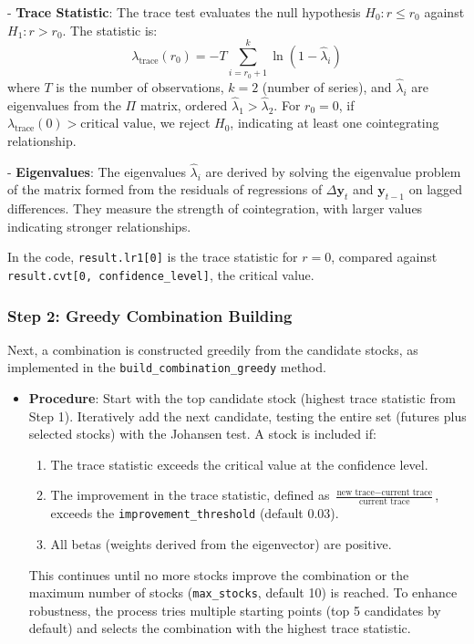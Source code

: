 \documentclass[a4paper,12pt]{article}
\begin{document}
- \textbf{Trace Statistic}: The trace test evaluates the null hypothesis \(H_0: r \leq r_0\) against \(H_1: r > r_0\). The statistic is:
  \[
  \lambda_{\text{trace}}(r_0) = -T \sum_{i=r_0+1}^{k} \ln(1 - \hat{\lambda}_i)
  \]
  where \(T\) is the number of observations, \(k = 2\) (number of series), and \(\hat{\lambda}_i\) are eigenvalues from the \(\Pi\) matrix, ordered \(\hat{\lambda}_1 > \hat{\lambda}_2\). For \(r_0 = 0\), if \(\lambda_{\text{trace}}(0) > \text{critical value}\), we reject \(H_0\), indicating at least one cointegrating relationship.

- \textbf{Eigenvalues}: The eigenvalues \(\hat{\lambda}_i\) are derived by solving the eigenvalue problem of the matrix formed from the residuals of regressions of \(\Delta \mathbf{y}_t\) and \(\mathbf{y}_{t-1}\) on lagged differences. They measure the strength of cointegration, with larger values indicating stronger relationships.

In the code, \texttt{result.lr1[0]} is the trace statistic for \(r = 0\), compared against \texttt{result.cvt[0, confidence\_level]}, the critical value.

\subsubsection{Step 2: Greedy Combination Building}
Next, a combination is constructed greedily from the candidate stocks, as implemented in the \texttt{build\_combination\_greedy} method.

\begin{itemize}
    \item \textbf{Procedure}: Start with the top candidate stock (highest trace statistic from Step 1). Iteratively add the next candidate, testing the entire set (futures plus selected stocks) with the Johansen test. A stock is included if:
    \begin{enumerate}
        \item The trace statistic exceeds the critical value at the confidence level.
        \item The improvement in the trace statistic, defined as \(\frac{\text{new trace} - \text{current trace}}{\text{current trace}}\), exceeds the \texttt{improvement\_threshold} (default 0.03).
        \item All betas (weights derived from the eigenvector) are positive.
    \end{enumerate}
    This continues until no more stocks improve the combination or the maximum number of stocks (\texttt{max\_stocks}, default 10) is reached. To enhance robustness, the process tries multiple starting points (top 5 candidates by default) and selects the combination with the highest trace statistic.
\end{itemize}
\end{document}
